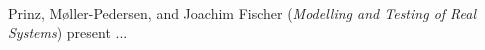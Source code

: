 

\ \hline \ %

Prinz, M{\o}ller-Pedersen, and Joachim Fischer
\cite{isola-2016-prinz}
({\em Modelling and Testing of Real Systems})
present ...

